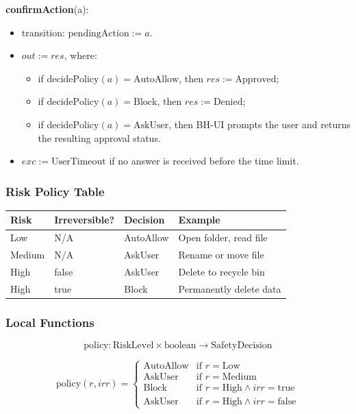 \documentclass[12pt, titlepage]{article}
\begin{document}
\noindent
\textbf{confirmAction}(a):
\begin{itemize}
  \item transition: $\text{pendingAction} := a$.
  \item $out := res$, where:
  \begin{itemize}
    \item if $\text{decidePolicy}(a) = \text{AutoAllow}$, then $res := \text{Approved}$;
    \item if $\text{decidePolicy}(a) = \text{Block}$, then $res := \text{Denied}$;
    \item if $\text{decidePolicy}(a) = \text{AskUser}$, then BH-UI prompts the user and returns the resulting approval status.
  \end{itemize}
  \item $exc := \text{UserTimeout}$ if no answer is received before the time limit.
\end{itemize}

\subsubsection{Risk Policy Table}

\begin{center}
\begin{tabular}{p{2cm} p{3cm} p{3cm} p{3cm}}
\toprule
\textbf{Risk} & \textbf{Irreversible?} & \textbf{Decision} & \textbf{Example} \\
\midrule
Low & N/A & AutoAllow & Open folder, read file \\
Medium & N/A & AskUser & Rename or move file \\
High & false & AskUser & Delete to recycle bin \\
High & true & Block & Permanently delete data \\
\bottomrule
\end{tabular}
\end{center}

\subsubsection{Local Functions}

\[
  \text{policy} : \text{RiskLevel} \times \text{boolean} \rightarrow
  \text{SafetyDecision}
\]

\[
  \text{policy}(r, irr) =
  \begin{cases}
    \text{AutoAllow} & \text{if } r = \text{Low}\\
    \text{AskUser} & \text{if } r = \text{Medium}\\
    \text{Block} & \text{if } r = \text{High} \land irr = \text{true}\\
    \text{AskUser} & \text{if } r = \text{High} \land irr = \text{false}
  \end{cases}
\]
\end{document}
